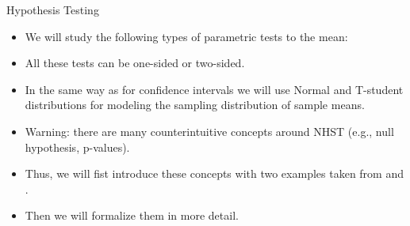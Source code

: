 \documentclass[handout]{beamer}
\begin{document}
\begin{frame}{Hypothesis Testing}
 \scriptsize{

\begin{itemize}

 \item We will study the following types of parametric tests to the mean:

  \item All these tests can be one-sided or two-sided.
  
  \item In the same way as for confidence intervals we will use Normal and T-student distributions for modeling the sampling distribution of sample means.
  
   \item Warning: there are many counterintuitive concepts around NHST (e.g., null hypothesis, p-values).
 \item Thus, we will fist introduce these concepts with two  examples taken from \cite{poldrack2019statistical} and \cite{Marchini}.
 \item Then we will formalize them in more detail.
  

\end{itemize}

}

\end{frame}
\end{document}
